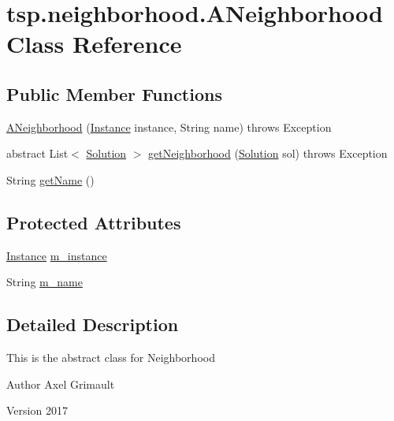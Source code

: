 \hypertarget{classtsp_1_1neighborhood_1_1_a_neighborhood}{}\section{tsp.\+neighborhood.\+A\+Neighborhood Class Reference}
\label{classtsp_1_1neighborhood_1_1_a_neighborhood}
\subsection*{Public Member Functions}
\begin{DoxyCompactItemize}
\item 
\mbox{\hyperlink{classtsp_1_1neighborhood_1_1_a_neighborhood_aec2c19f05baf76258fd83483b8637da2}{A\+Neighborhood}} (\mbox{\hyperlink{classtsp_1_1_instance}{Instance}} instance, String name)  throws Exception 
\item 
abstract List$<$ \mbox{\hyperlink{classtsp_1_1_solution}{Solution}} $>$ \mbox{\hyperlink{classtsp_1_1neighborhood_1_1_a_neighborhood_a5b8c16fd20fb089c86c831e6a884b8f3}{get\+Neighborhood}} (\mbox{\hyperlink{classtsp_1_1_solution}{Solution}} sol)  throws Exception 
\item 
String \mbox{\hyperlink{classtsp_1_1neighborhood_1_1_a_neighborhood_a87ac72c2bdfadde28119eb996f92544e}{get\+Name}} ()
\end{DoxyCompactItemize}
\subsection*{Protected Attributes}
\begin{DoxyCompactItemize}
\item 
\mbox{\hyperlink{classtsp_1_1_instance}{Instance}} \mbox{\hyperlink{classtsp_1_1neighborhood_1_1_a_neighborhood_a6429b45bcc40a067c68f677a4754be9c}{m\+\_\+instance}}
\item 
String \mbox{\hyperlink{classtsp_1_1neighborhood_1_1_a_neighborhood_a8b6fb5f32e75265e1fd670a8158066b5}{m\+\_\+name}}
\end{DoxyCompactItemize}


\subsection{Detailed Description}
This is the abstract class for Neighborhood \begin{DoxyAuthor}{Author}
Axel Grimault 
\end{DoxyAuthor}
\begin{DoxyVersion}{Version}
2017 
\end{DoxyVersion}


